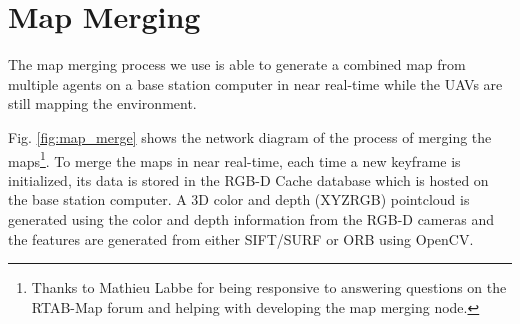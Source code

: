 \documentclass[letterpaper, 10 pt, conference]{ieeeconf}  %
\newcommand{\todo}[1]{{\color{blue}[TODO: #1]}}
\begin{document}
%
%
%
%

\section{Map Merging}\label{merge}

The map merging process we use is able to generate a combined map from multiple agents on a base station computer in near real-time while the UAVs are still mapping the environment.

Fig. \ref{fig:map_merge} shows the network diagram of the process of merging the maps\footnote[3]{Thanks to Mathieu Labbe for being responsive to answering questions on the RTAB-Map forum and helping with developing the map merging node.}. To merge the maps in near real-time, each time a new keyframe is initialized, its data is stored in the RGB-D Cache database which is hosted on the base station computer. A 3D color and depth (XYZRGB) pointcloud is generated using the color and depth information from the RGB-D cameras and the features are generated from either SIFT/SURF or ORB using OpenCV.
\end{document}
